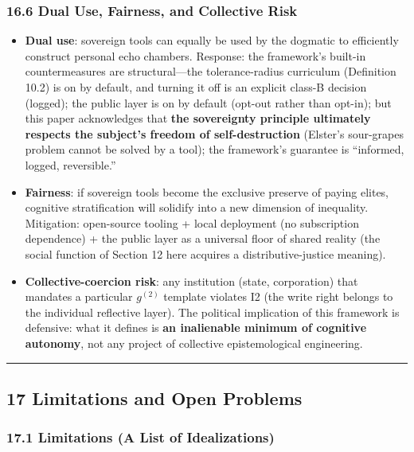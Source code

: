 \documentclass[
  11pt]{article}
\providecommand{\tightlist}{%
  \setlength{\itemsep}{0pt}\setlength{\parskip}{0pt}}
\begin{document}
\subsubsection{16.6 Dual Use, Fairness, and Collective
Risk}\label{dual-use-fairness-and-collective-risk}

\begin{itemize}
\tightlist
\item
  \textbf{Dual use}: sovereign tools can equally be used by the dogmatic
  to efficiently construct personal echo chambers. Response: the
  framework's built-in countermeasures are structural---the
  tolerance-radius curriculum (Definition 10.2) is on by default, and
  turning it off is an explicit class-B decision (logged); the public
  layer is on by default (opt-out rather than opt-in); but this paper
  acknowledges that \textbf{the sovereignty principle ultimately
  respects the subject's freedom of self-destruction} (Elster's
  sour-grapes problem cannot be solved by a tool); the framework's
  guarantee is ``informed, logged, reversible.''
\item
  \textbf{Fairness}: if sovereign tools become the exclusive preserve of
  paying elites, cognitive stratification will solidify into a new
  dimension of inequality. Mitigation: open-source tooling + local
  deployment (no subscription dependence) + the public layer as a
  universal floor of shared reality (the social function of Section 12
  here acquires a distributive-justice meaning).
\item
  \textbf{Collective-coercion risk}: any institution (state,
  corporation) that mandates a particular \(g^{(2)}\) template violates
  I2 (the write right belongs to the individual reflective layer). The
  political implication of this framework is defensive: what it defines
  is \textbf{an inalienable minimum of cognitive autonomy}, not any
  project of collective epistemological engineering.
\end{itemize}

\begin{center}\rule{0.5\linewidth}{0.5pt}\end{center}

\subsection{17 Limitations and Open
Problems}\label{limitations-and-open-problems}

\subsubsection{17.1 Limitations (A List of
Idealizations)}\label{limitations-a-list-of-idealizations}
\end{document}
